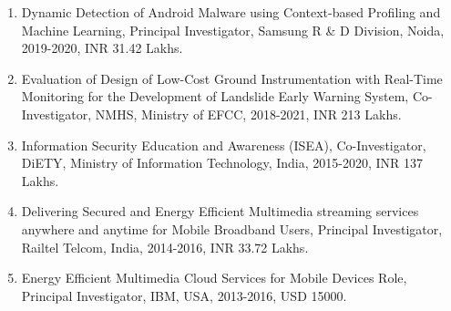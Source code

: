 \begin{enumerate}


\item Dynamic Detection of Android Malware using Context-based Profiling and Machine Learning, Principal Investigator, Samsung R \& D Division, Noida, 2019-2020, INR 31.42 Lakhs. 

\item Evaluation of Design of Low-Cost Ground Instrumentation with Real-Time Monitoring for the Development of Landslide Early Warning System, Co-Investigator, NMHS, Ministry of EFCC, 2018-2021, INR 213 Lakhs.

\item Information Security Education and Awareness (ISEA), Co-Investigator, DiETY, Ministry of Information Technology, India, 2015-2020, INR 137 Lakhs. 

\item Delivering Secured and Energy Efficient Multimedia streaming services anywhere and anytime for Mobile Broadband Users, Principal Investigator, Railtel Telcom, India, 2014-2016, INR 33.72 Lakhs. 

\item Energy Efficient Multimedia Cloud Services for Mobile Devices 
Role, Principal Investigator, IBM, USA, 2013-2016, USD 15000.

\end{enumerate}